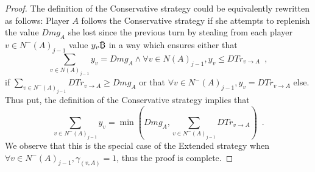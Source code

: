 \begin{proof}
  The definition of the Conservative strategy could be equivalently rewritten as follows: Player $A$ follows the Conservative
  strategy if she attempts to replenish the value $Dmg_A$ she lost since the previous turn by stealing from each player $v \in
  N^{-}\left(A\right)_{j-1}$ value $y_v\bitcoin$ in a way which ensures either that
  \begin{equation*}
    \sum\limits_{v \in N\left(A\right)_{j-1}}y_v = Dmg_A \wedge \forall v \in N\left(A\right)_{j-1}, y_v \leq DTr_{v
    \rightarrow A} \enspace,
  \end{equation*}
  if $\sum\limits_{v \in N^{-}\left(A\right)_{j-1}}DTr_{v \rightarrow A} \geq Dmg_A$ or that $\forall v \in
  N^{-}\left(A\right)_{j-1}, y_v = DTr_{v \rightarrow A}$ else. Thus put, the definition of the Conservative strategy implies
  that
  \begin{equation*}
    \sum\limits_{v \in N^{-}\left(A\right)_{j-1}}y_v = \min{\left(Dmg_A, \sum\limits_{v \in N^{-}\left(A\right)_{j-1}}DTr_{v
    \rightarrow A}\right)} \enspace.
  \end{equation*}
  We observe that this is the special case of the Extended strategy when $\forall v \in N^{-}\left(A\right)_{j-1},
  \gamma_{\left(v, A\right)} = 1$, thus the proof is complete.
\end{proof}
